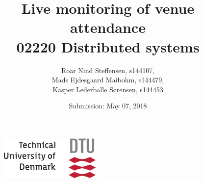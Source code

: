 \documentclass{article}
\title
{ 
    \huge{Live monitoring of venue attendance} \\
    \Large{02220 Distributed systems}
}
\author
{
    Roar Nind Steffensen, s144107,\\
    Mads Ejdesgaard Maibohm, s144479,\\
    Kasper Lederballe Sørensen, s144453
}
\date
{
    Submission: May 07, 2018
}
\begin{document}
\maketitle
\vfill
\begin{figure}[H]
    \centering
    \includegraphics[width=5cm]{images/DTULOGO.pdf}
\end{figure}
\vspace{2cm}

\newpage
\tableofcontents
\pagebreak
{}







\end{document}
